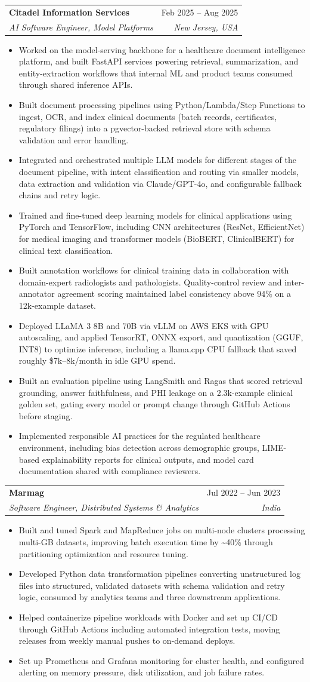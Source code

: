 \documentclass[letterpaper,10.5pt]{article}
\makeatletter
\newcommand{\resumeItem}[1]{
  \item\small{
    {#1 \vspace{-2pt}}
  }
}
\newcommand{\resumeSubheading}[4]{
  \vspace{-2pt}\item
    \begin{tabular*}{0.97\textwidth}[t]{l@{\extracolsep{\fill}}r}
      \textbf{#1} & #2 \\
      \textit{\small#3} & \textit{\small #4} \\
    \end{tabular*}\vspace{-7pt}
}
\newcommand{\resumeItemListStart}{\begin{itemize}}
\newcommand{\resumeItemListEnd}{\end{itemize}\vspace{-5pt}}
\makeatother
\begin{document}
\resumeSubheading
  {Citadel Information Services}{Feb 2025 -- Aug 2025}
  {AI Software Engineer, Model Platforms}{New Jersey, USA}
  \resumeItemListStart
    \resumeItem{Worked on the model-serving backbone for a healthcare document intelligence platform, and built FastAPI services powering retrieval, summarization, and entity-extraction workflows that internal ML and product teams consumed through shared inference APIs.}
    \resumeItem{Built document processing pipelines using Python/Lambda/Step Functions to ingest, OCR, and index clinical documents (batch records, certificates, regulatory filings) into a pgvector-backed retrieval store with schema validation and error handling.}
    \resumeItem{Integrated and orchestrated multiple LLM models for different stages of the document pipeline, with intent classification and routing via smaller models, data extraction and validation via Claude/GPT-4o, and configurable fallback chains and retry logic.}
    \resumeItem{Trained and fine-tuned deep learning models for clinical applications using PyTorch and TensorFlow, including CNN architectures (ResNet, EfficientNet) for medical imaging and transformer models (BioBERT, ClinicalBERT) for clinical text classification.}
    \resumeItem{Built annotation workflows for clinical training data in collaboration with domain-expert radiologists and pathologists. Quality-control review and inter-annotator agreement scoring maintained label consistency above 94\% on a 12k-example dataset.}
    \resumeItem{Deployed LLaMA 3 8B and 70B via vLLM on AWS EKS with GPU autoscaling, and applied TensorRT, ONNX export, and quantization (GGUF, INT8) to optimize inference, including a llama.cpp CPU fallback that saved roughly \$7k--8k/month in idle GPU spend.}
    \resumeItem{Built an evaluation pipeline using LangSmith and Ragas that scored retrieval grounding, answer faithfulness, and PHI leakage on a 2.3k-example clinical golden set, gating every model or prompt change through GitHub Actions before staging.}
    \resumeItem{Implemented responsible AI practices for the regulated healthcare environment, including bias detection across demographic groups, LIME-based explainability reports for clinical outputs, and model card documentation shared with compliance reviewers.}
  \resumeItemListEnd

\resumeSubheading
  {Marmag}{Jul 2022 -- Jun 2023}
  {Software Engineer, Distributed Systems \& Analytics}{India}
  \resumeItemListStart
    \resumeItem{Built and tuned Spark and MapReduce jobs on multi-node clusters processing multi-GB datasets, improving batch execution time by \textasciitilde40\% through partitioning optimization and resource tuning.}
    \resumeItem{Developed Python data transformation pipelines converting unstructured log files into structured, validated datasets with schema validation and retry logic, consumed by analytics teams and three downstream applications.}
    \resumeItem{Helped containerize pipeline workloads with Docker and set up CI/CD through GitHub Actions including automated integration tests, moving releases from weekly manual pushes to on-demand deploys.}
    \resumeItem{Set up Prometheus and Grafana monitoring for cluster health, and configured alerting on memory pressure, disk utilization, and job failure rates.}
  \resumeItemListEnd
\end{document}
